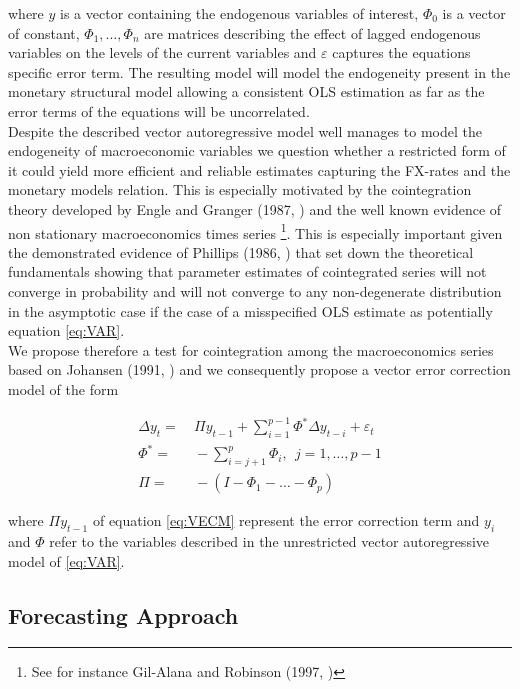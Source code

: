 where $y$ is a vector containing the endogenous variables of interest, $\Phi_0$ is a vector of constant,
$\Phi_1,  \dots  , \Phi_n$ are matrices describing the effect of lagged endogenous variables on the levels of
the current variables and $\varepsilon$ captures the equations specific error term.
The resulting model will model the endogeneity present in the monetary structural model allowing a consistent
OLS estimation as far as the error terms of the equations will be uncorrelated.
\\
Despite the described vector autoregressive model well manages to model the endogeneity of macroeconomic
variables we question whether a restricted form of it could yield more efficient and reliable estimates capturing
the FX-rates and the monetary models relation. This is especially motivated by the cointegration theory developed
by Engle and Granger (1987, \cite{EngleGranger}) and the well known evidence of non stationary macroeconomics
times series \footnote{See for instance Gil-Alana and Robinson (1997, \cite{GilAlanaRobinson})}. This is especially
important given the demonstrated evidence of Phillips (1986, \cite{Phillips}) that set down the theoretical fundamentals
showing that parameter estimates of cointegrated series will not converge in probability and will not converge to any
non-degenerate distribution in the asymptotic case if the case of a misspecified OLS estimate as potentially equation \ref{eq:VAR}.
\\
We propose therefore a test for cointegration among the macroeconomics series based on Johansen (1991, \cite{Johansen})
and we consequently propose a vector error correction model of the form

\begin{align}
  \Delta y_t =& \ \Pi y_{t-1} + \sum^{p-1}_{i=1} \Phi^{*} \Delta y_{t-i} + \varepsilon_t \nonumber\\
  \Phi^{*} =& \ - \sum^{p}_{i=j+1} \Phi_i, \ \  j = 1, \dots, p-1 \label{eq:VECM}\\
  \Pi =& \ -(I - \Phi_1 - \dots - \Phi_p) \nonumber\
\end{align}

where $\Pi y_{t-1}$ of equation \ref{eq:VECM} represent the error correction term and $y_i$ and $\Phi$
refer to the variables described in the unrestricted vector autoregressive model of \ref{eq:VAR}.

\subsection{Forecasting Approach}

